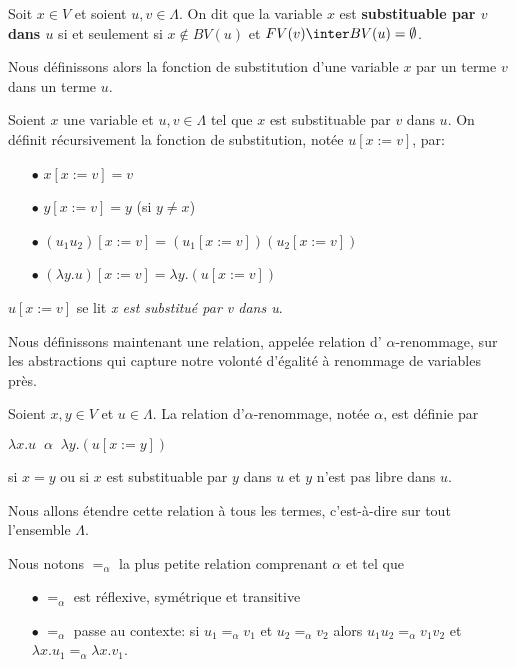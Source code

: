 \begin{definition} 
  Soit $x \in V$ et soient $u, v \in \Lambda$. On dit que la variable $x$ est
  \textbf{substituable par $v$ dans $u$} si et seulement si $x \notin BV(u)$ et
  $FV(v) \inter BV(u) = \emptyset$.
\end{definition}

Nous définissons alors la fonction de substitution d'une variable $x$ par un
terme $v$ dans un terme $u$.

\begin{definition} 
  Soient $x$ une variable et $u, v \in \Lambda$ tel que $x$ est substituable par
  $v$ dans $u$. On définit récursivement la fonction de substitution, notée $u[x := v]$, par:
  \begin{itemize}
  \item[$\bullet$] $x[x := v] = v$
  \item[$\bullet$] $y[x := v] = y$ (si $y \neq x$)
  \item[$\bullet$] $(u_{1} u_{2})[x := v] = (u_{1}[x := v])(u_{2}[x := v])$
  \item[$\bullet$] $(\lambda y . u)[x := v] = \lambda y . (u[x := v])$
  \end{itemize}
  $u[x := v]$ se lit \textit{x est substitué par v dans u}.
\end{definition}

Nous définissons maintenant une relation, appelée relation d'
\textbf{$\alpha$}-renommage, sur les abstractions qui capture
notre volonté d'égalité à renommage de variables près.

\begin{definition} 
  Soient $x, y \in V$ et $u \in \Lambda$.
  La relation d'$\alpha$-renommage, notée $\alpha$, est définie par

  \begin{math}
    \lambda x . u \;\; \alpha \;\; \lambda y . (u[x := y])
  \end{math}

  si $x = y$ ou si $x$ est substituable par $y$ dans $u$ et $y$ n'est pas libre
  dans $u$.
\end{definition}

Nous allons étendre cette relation à tous les termes, c'est-à-dire sur tout l'ensemble $\Lambda$.

Nous notons $=_{\alpha}$ la plus petite relation comprenant $\alpha$ et tel que
\begin{itemize}
  \item[$\bullet$] $=_{\alpha}$ est réflexive, symétrique et transitive
  \item[$\bullet$] $=_{\alpha}$ passe au contexte: si $u_{1} =_{\alpha} v_{1}$
    et $u_{2} =_{\alpha} v_{2}$ alors $u_{1}u_{2} =_{\alpha} v_{1}v_{2}$ et
    $\lambda x . u_{1} =_{\alpha} \lambda x . v_{1}$.
\end{itemize}

